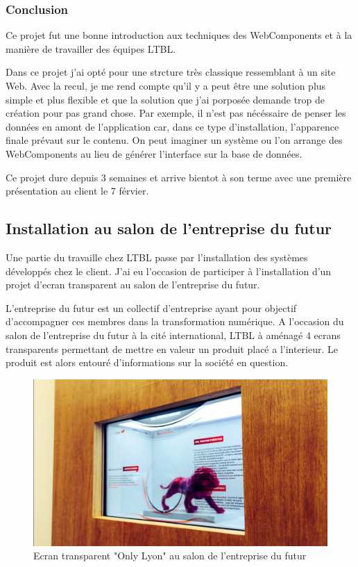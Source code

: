 \documentclass{article}
\begin{document}
\subsubsection{Conclusion}

Ce projet fut une bonne introduction aux techniques des WebComponents et à la manière de travailler des équipes LTBL\@.

Dans ce projet j'ai opté pour une strcture très classique ressemblant à un site Web.
Avec la recul, je me rend compte qu'il y a peut être une solution plus simple et plus flexible et que la solution que j'ai porposée demande trop de création pour pas grand chose.
Par exemple, il n'est pas nécéssaire de penser les données en amont de l'application car, dans ce type d'installation, l'apparence finale prévaut sur le contenu.
On peut imaginer un système ou l'on arrange des WebComponents au lieu de générer l'interface sur la base de données.

Ce projet dure depuis 3 semaines et arrive bientot à son terme avec une première présentation au client le 7 férvier.

\subsection{Installation au salon de l'entreprise du futur}

Une partie du travaille chez LTBL passe par l'installation des systèmes développés chez le client.
J'ai eu l'occasion de participer à l'installation d'un projet d'ecran transparent au salon de l'entreprise du futur.

L'entreprise du futur est un collectif d'entreprise ayant pour objectif d'accompagner ces membres dans la transformation numérique.
A l'occasion du salon de l'entreprise du futur à la cité international, LTBL à aménagé 4 ecrans transparents permettant de mettre en valeur un produit placé a l'interieur.
Le produit est alors entouré d'informations sur la société en question.

\begin{figure}[h]
    \centering
    \includegraphics[scale=0.3]{ecran-transparent.jpg}
    \caption{Ecran transparent "Only Lyon" au salon de l'entreprise du futur}
\end{figure}
\end{document}
